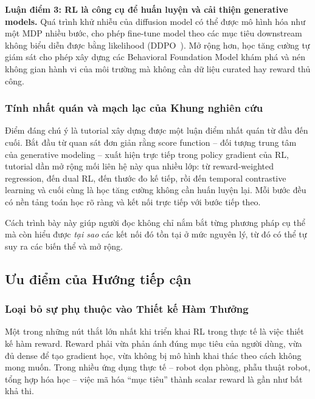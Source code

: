 \textbf{Luận điểm 3: RL là công cụ để huấn luyện và cải thiện generative models.}
Quá trình khử nhiễu của diffusion model có thể được mô hình hóa như một MDP nhiều bước,
cho phép fine-tune model theo các mục tiêu downstream không biểu diễn được bằng likelihood (DDPO~\cite{black2024ddpo}).
Mở rộng hơn, học tăng cường tự giám sát cho phép xây dựng các Behavioral Foundation Model khám phá và nén không
gian hành vi của môi trường mà không cần dữ liệu curated hay reward thủ công.

\subsubsection{Tính nhất quán và mạch lạc của Khung nghiên cứu}

Điểm đáng chú ý là tutorial xây dựng được một luận điểm nhất quán từ đầu đến cuối.
Bắt đầu từ quan sát đơn giản rằng score function -- đối tượng trung tâm của generative modeling --
xuất hiện trực tiếp trong policy gradient của RL, tutorial dần mở rộng mối liên hệ này qua nhiều lớp:
từ reward-weighted regression, đến dual RL, đến thước đo kế tiếp, rồi đến temporal contrastive learning
và cuối cùng là học tăng cường không cần huấn luyện lại.
Mỗi bước đều có nền tảng toán học rõ ràng và kết nối trực tiếp với bước tiếp theo.

Cách trình bày này giúp người đọc không chỉ nắm bắt từng phương pháp cụ thể mà còn hiểu được
\textit{tại sao} các kết nối đó tồn tại ở mức nguyên lý, từ đó có thể tự suy ra các biến thể và mở rộng.

\subsection{Ưu điểm của Hướng tiếp cận}

\subsubsection{Loại bỏ sự phụ thuộc vào Thiết kế Hàm Thưởng}

Một trong những nút thắt lớn nhất khi triển khai RL trong thực tế là việc thiết kế hàm reward.
Reward phải vừa phản ánh đúng mục tiêu của người dùng, vừa đủ dense để tạo gradient học, vừa không
bị mô hình khai thác theo cách không mong muốn.
Trong nhiều ứng dụng thực tế -- robot dọn phòng, phẫu thuật robot, tổng hợp hóa học -- việc mã hóa
``mục tiêu'' thành scalar reward là gần như bất khả thi.

